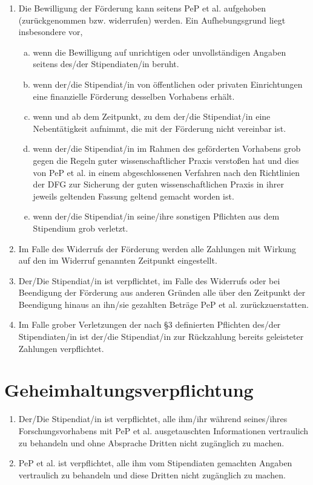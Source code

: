 \documentclass[
  paper=a4,
  fontsize=12pt,
  DIV=16,
  parskip=full,
  headinclude=true,
]{scrartcl}
\begin{document}
\begin{enumerate}[\qquad(1)]
	\item Die Bewilligung der Förderung kann seitens PeP et al. aufgehoben
		(zurückgenommen bzw. widerrufen) werden. Ein Aufhebungsgrund
		liegt insbesondere vor,
		\begin{enumerate}[(a)]
			\item wenn die Bewilligung auf unrichtigen oder
				unvollständigen Angaben seitens des/der
				Stipendiaten/in beruht.
			\item wenn der/die Stipendiat/in von öffentlichen oder
				privaten Einrichtungen eine finanzielle Förderung
				desselben Vorhabens erhält.
			\item wenn und ab dem Zeitpunkt, zu dem der/die Stipendiat/in
				eine Nebentätigkeit aufnimmt, die mit der Förderung
				nicht vereinbar ist.
			\item wenn der/die Stipendiat/in im Rahmen des geförderten
				Vorhabens grob gegen die Regeln guter wissenschaftlicher
				Praxis verstoßen hat und dies von PeP et al. in einem
				abgeschlossenen Verfahren nach den Richtlinien
				der DFG zur Sicherung der guten wissenschaftlichen
				Praxis in ihrer jeweils geltenden Fassung geltend
				gemacht worden ist.
			\item wenn der/die Stipendiat/in seine/ihre sonstigen Pflichten
				aus dem Stipendium grob verletzt.
		\end{enumerate}
	\item Im Falle des Widerrufs der Förderung werden alle Zahlungen mit Wirkung
		auf den im Widerruf genannten Zeitpunkt eingestellt.
	\item Der/Die Stipendiat/in ist verpflichtet, im Falle des Widerrufs oder
		bei Beendigung der Förderung aus anderen Gründen alle über den
		Zeitpunkt der Beendigung hinaus an ihn/sie gezahlten Beträge 
		PeP et al. zurückzuerstatten.
	\item Im Falle grober Verletzungen der nach §3 definierten Pflichten
		des/der Stipendiaten/in ist der/die Stipendiat/in zur Rückzahlung
		bereits geleisteter Zahlungen verpflichtet.
\end{enumerate}

\section{Geheimhaltungsverpflichtung}

\begin{enumerate}[\qquad(1)]
	\item Der/Die Stipendiat/in ist verpflichtet, alle ihm/ihr während
		seines/ihres Forschungsvorhabens mit PeP et al. ausgetauschten
		Informationen vertraulich zu behandeln und ohne Absprache
		Dritten nicht zugänglich zu machen.
	\item PeP et al. ist verpflichtet, alle ihm vom Stipendiaten gemachten
		Angaben vertraulich zu behandeln und diese Dritten nicht
		zugänglich zu machen.
\end{enumerate}
\end{document}

